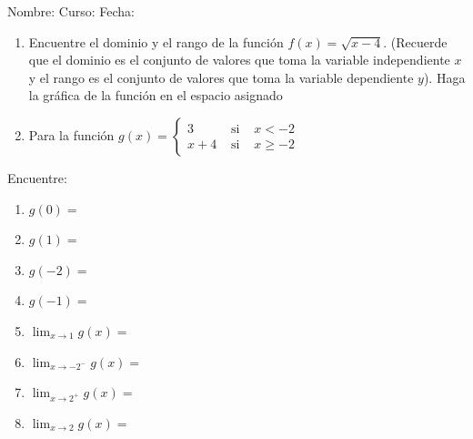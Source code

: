 \documentclass[letterpaper,fleqn]{article}
\newcommand{\LineaNombre}{%
\par
\vspace{\baselineskip}
Nombre:\hrulefill \; Curso: \underline{\hspace*{48pt}} \; Fecha: \underline{\hspace*{2.5cm}} \relax
\par}
\let\ds\displaystyle
\begin{document}
\LineaNombre
\begin{enumerate}
 \item Encuentre el dominio y el rango de la función $f(x)=\sqrt{x-4}$. (Recuerde que el dominio es el conjunto de valores que toma la variable independiente $x$ y el rango es el conjunto de valores que toma la variable dependiente $y$). Haga la gráfica de la función en el espacio asignado
 
 \noanswer
 \item Para la función $g(x)=\left\{\begin{array}{lcl}
 3 & \mbox{ si } & x<-2\\
 x+4 & \mbox{ si } & x\geq -2
 \end{array}\right.$
 \end{enumerate}
 Encuentre:
\begin{enumerate}
\item $g(0)=$
\item $g(1)=$
\item $g(-2)=$
\item $g(-1)=$
\item $\ds{\lim_{x\rightarrow 1}g(x)}=$
\item $\ds{\lim_{x\rightarrow -2^{-}}g(x)}=$
\item $\ds{\lim_{x\rightarrow 2^{+}}g(x)}=$
\item $\ds{\lim_{x\rightarrow 2}g(x)}=$
\end{enumerate}
\end{document}

